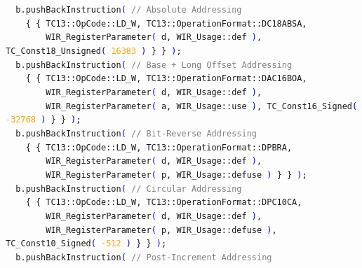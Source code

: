 \begin{wirExample}
{\small
\verb|  |\texttt{b.pushBackInstruction\textcolor{blue}{(} \textcolor{gray}{// Absolute Addressing}} \\
\verb|    |\texttt{\{ \{ TC13::OpCode::LD\_W, TC13::OperationFormat::DC18ABSA,} \\
\verb|        |\texttt{WIR\_RegisterParameter\textcolor{blue}{(} d, WIR\_Usage::def \textcolor{blue}{)}, TC\_Const18\_Unsigned\textcolor{blue}{(} \textcolor{orange}{16383} \textcolor{blue}{)} \} \} \textcolor{blue}{)};} \\
\verb|  |\texttt{b.pushBackInstruction\textcolor{blue}{(} \textcolor{gray}{// Base + Long Offset Addressing}} \\
\verb|    |\texttt{\{ \{ TC13::OpCode::LD\_W, TC13::OperationFormat::DAC16BOA,} \\
\verb|        |\texttt{WIR\_RegisterParameter\textcolor{blue}{(} d, WIR\_Usage::def \textcolor{blue}{)},} \\
\verb|        |\texttt{WIR\_RegisterParameter\textcolor{blue}{(} a, WIR\_Usage::use \textcolor{blue}{)}, TC\_Const16\_Signed\textcolor{blue}{(} \textcolor{orange}{-32768} \textcolor{blue}{)} \} \} \textcolor{blue}{)};} \\
\verb|  |\texttt{b.pushBackInstruction\textcolor{blue}{(} \textcolor{gray}{// Bit-Reverse Addressing}} \\
\verb|    |\texttt{\{ \{ TC13::OpCode::LD\_W, TC13::OperationFormat::DPBRA,} \\
\verb|        |\texttt{WIR\_RegisterParameter\textcolor{blue}{(} d, WIR\_Usage::def \textcolor{blue}{)},} \\
\verb|        |\texttt{WIR\_RegisterParameter\textcolor{blue}{(} p, WIR\_Usage::defuse \textcolor{blue}{)} \} \} \textcolor{blue}{)};} \\
\verb|  |\texttt{b.pushBackInstruction\textcolor{blue}{(} \textcolor{gray}{// Circular Addressing}} \\
\verb|    |\texttt{\{ \{ TC13::OpCode::LD\_W, TC13::OperationFormat::DPC10CA,} \\
\verb|        |\texttt{WIR\_RegisterParameter\textcolor{blue}{(} d, WIR\_Usage::def \textcolor{blue}{)},} \\
\verb|        |\texttt{WIR\_RegisterParameter\textcolor{blue}{(} p, WIR\_Usage::defuse \textcolor{blue}{)}, TC\_Const10\_Signed\textcolor{blue}{(} \textcolor{orange}{-512} \textcolor{blue}{)} \} \} \textcolor{blue}{)};} \\
\verb|  |\texttt{b.pushBackInstruction\textcolor{blue}{(} \textcolor{gray}{// Post-Increment Addressing}} \\
}
\end{wirExample}
